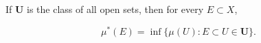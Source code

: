 If $\mathbf{U}$ is the class of all open sets, then for every $E \subset X$,

$$\mu^*(E) = \inf \{ \mu(U): E \subset U \in \mathbf{U} \}.$$
